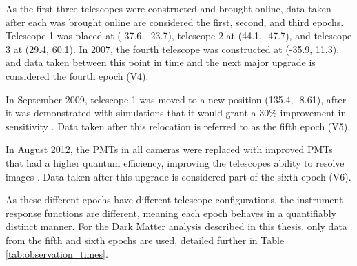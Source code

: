 As the first three telescopes were constructed and brought online, data taken after each was brought online are considered the first, second, and third epochs.
Telescope 1 was placed at (-37.6, -23.7), telescope 2 at (44.1, -47.7), and telescope 3 at (29.4, 60.1).
In 2007, the fourth telescope was constructed at (-35.9, 11.3), and data taken between this point in time and the next major upgrade is considered the fourth epoch (V4).

In September 2009, telescope 1 was moved to a new position (135.4, -8.61), after it was demonstrated with simulations that it would grant a \nicetilde{}30\% improvement in sensitivity \cite{veritas_t1_move}.
Data taken after this relocation is referred to as the fifth epoch (V5).

In August 2012, the PMTs in all cameras were replaced with improved PMTs that had a higher quantum efficiency, improving the telescopes ability to resolve images \cite{pmtmodels}.
Data taken after this upgrade is considered part of the sixth epoch (V6).

As these different epochs have different telescope configurations, the instrument response functions are different, meaning each epoch behaves in a quantifiably distinct manner.
For the Dark Matter analysis described in this thesis, only data from the fifth and sixth epochs are used, detailed further in Table \ref{tab:observation_times}.


